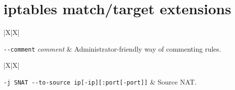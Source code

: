 \chapter{iptables match/target extensions}
\label{app:iptables-extensions}

\lstset{language=sh,basicstyle=\ttfamily}

\begin{table}[htbp]
  \footnotesize
  \begin{tabularx}{\textwidth}{ |X|X| }
    \hline
    \\ \hline

    \lstinline{--comment} \emph{comment} &
    Administrator-friendly way of commenting rules.
    \\ \hline

  \end{tabularx}
  \caption{Common iptables match extensions.}

  \bigskip

  \begin{tabularx}{\textwidth}{ |X|X| }
    \hline
    \\ \hline

    \lstinline{-j SNAT --to-source ip[-ip][:port[-port]]} &
    Source NAT.
    \\ \hline

  \end{tabularx}
  \caption{Common iptables target extensions.}
\end{table}

